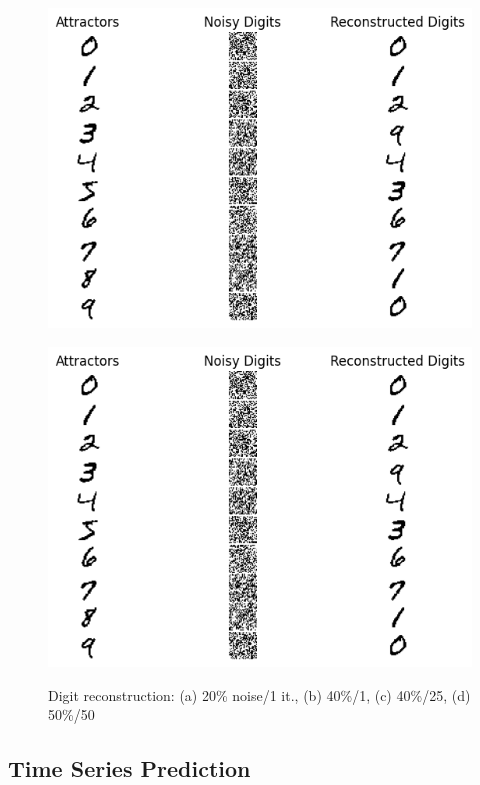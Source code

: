 \begin{figure}[h!]
\begin{minipage}[t]{0.24\textwidth}
        \includegraphics[width=\textwidth]{figures/hopfield-digits-40-noise-25-it.png}
        \label{fig:hopfield-digits-40-noise-25-it}
    \end{minipage}
    \begin{minipage}[t]{0.24\textwidth}
        \includegraphics[width=\textwidth]{figures/hopfield-digits-50-noise-50-it.png}
        \label{fig:hopfield-digits-50-noise-50-it}
    \end{minipage}
    \caption{Digit reconstruction: (a) 20\% noise/1 it., (b) 40\%/1, (c) 40\%/25, (d) 50\%/50}
\end{figure}
\vspace{-10pt}

\subsection{Time Series Prediction}

